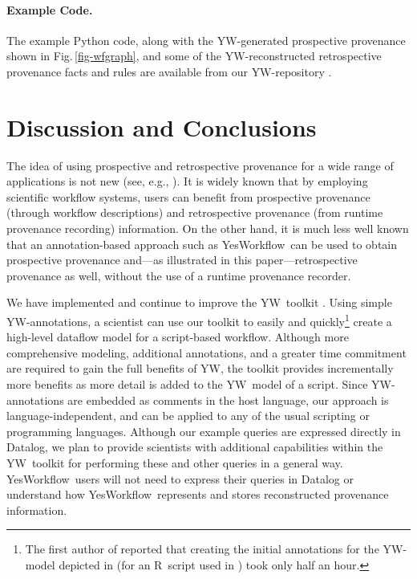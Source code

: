 \documentclass[nocopyrightspace]{sigplanconf}
\newcommand{\figref}[1]{Fig.\,\ref{#1}}
\newcommand{\YW}{\textsf{YesWorkflow}}
\newcommand{\yw}{\textsf{YW}}
\newcommand{\R}{\textsf{R}}
\begin{document}
\paragraph{Example Code.}
The example Python code, along with the \yw-generated prospective
provenance shown in \figref{fig-wfgraph}, and some of the
\yw-reconstructed retrospective provenance facts and rules are
available from our \yw-repository \cite{mcphillips2015example}.




\section{Discussion and Conclusions} 
\label{sec:discussion}

The idea of using prospective and retrospective provenance for a wide
range of applications is not new (see, e.g.,
\cite{zhao2006applying,missier2008data,frew2008automatic}).  It is
widely known that by employing scientific workflow systems, users can
benefit from prospective provenance (through workflow descriptions)
and retrospective provenance (from runtime provenance recording)
information. On the other hand, it is much less well known that an
annotation-based approach such as \YW\ can be used to obtain
prospective provenance and---as illustrated in this
paper---retrospective provenance as well, without the use of a runtime
provenance recorder.  

We have implemented and continue to improve the
\yw\ toolkit \cite{mcphillips2015ywIJDC,yw-website}. Using simple
\yw-annotations, a scientist can use our toolkit to easily and
quickly\footnote{The first author of \cite{bocinsky2014} reported that
  creating the initial annotations for the \yw-model depicted in
  \cite{mcphillips2015ywIJDC} (for an \R\ script used in
  \cite{bocinsky2014}) took only half an hour.  }  create a high-level
dataflow model for a script-based workflow.  Although more comprehensive 
modeling, additional annotations, and a greater time commitment are required 
to gain the full benefits of \yw, the toolkit provides incrementally more benefits 
as more detail is added to the \yw\ model of a script.  Since \yw-annotations are
embedded as comments in the host language, our approach is
language-independent, and can be applied to any of the usual scripting
or programming languages.  Although our example queries are expressed
directly in Datalog, we plan to provide scientists with additional capabilities
within the \yw\ toolkit for performing these and other queries in a general
way.  \YW\ users will not need to express their queries in Datalog
or understand how \YW\ represents and stores reconstructed provenance
information.
\end{document}
